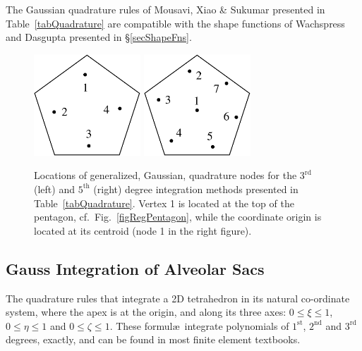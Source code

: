 The Gaussian quadrature rules of Mousavi, Xiao \& Sukumar \cite{Mousavietal10} presented in Table~\ref{tabQuadrature} are compatible with the shape functions of Wachspress \cite{Wachspress75,Wachspress16} and Dasgupta \cite{Dasgupta03} presented in \S\ref{secShapeFns}.

\begin{figure}
    \centering
    \includegraphics[width=4cm]{figures/pentagon_degree3.pdf}
    \hspace{1cm}
    \includegraphics[width=4cm]{figures/pentagon_degree5.pdf}
    \caption{Locations of generalized, Gaussian, quadrature nodes for the $3^{\mathrm{rd}}$ (left) and $5^{\mathrm{th}}$ (right) degree integration methods presented in Table~\ref{tabQuadrature}.  Vertex 1 is located at the top of the pentagon, cf.\ Fig.~\ref{figRegPentagon}, while the coordinate origin is located at its centroid (node 1 in the right figure).}
    \label{figQuadrature}
\end{figure}

\subsection{Gauss Integration of Alveolar Sacs}

The quadrature rules that integrate a 2D tetrahedron in its natural co-ordinate system, where the apex is at the origin, and along its three axes: $0 \leq \xi \leq 1$, $0 \leq \eta \leq 1$ and $0 \leq \zeta \leq 1$.  These formul\ae\ integrate polynomials of $1^{\text{st}}$, $2^{\text{nd}}$ and $3^{\text{rd}}$ degrees, exactly, and can be found in most finite element textbooks.  

